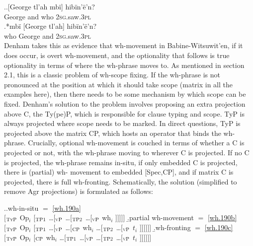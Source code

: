 \documentclass{glossa}
\begin{document}
\ex.\label{wh.230}\ag.{}[George tl'ah mb\"i] hib\"in'\"e'n?\\
   George and who \textsc{2sg}.saw.\textsc{3pl}\\
   \bg.*mb\"i [George tl'ah] hib\"in'\"e'n?\\
   who George and \textsc{2sg}.saw.\textsc{3pl}\\

Denham takes this as evidence that wh-movement in Babine-Witsuwit'en, if it does occur, is overt wh-movement, and the optionality that follows is true optionality in terms of where the wh-phrase moves to. As mentioned in section 2.1, this is a classic problem of wh-scope fixing. If the wh-phrase is not pronounced at the position at which it should take scope (matrix in all the examples here), then there needs to be some mechanism by which scope can be fixed. Denham's solution to the problem involves proposing an extra projection above C, the Ty(pe)P, which is responsible for clause typing and scope. TyP is always projected where scope needs to be marked. In direct questions, TyP is projected above the matrix CP, which hosts an operator that binds the wh-phrase. Crucially, optional wh-movement is couched in terms of whether a C is projected or not, with the wh-phrase moving to wherever C is projected. If no C is projected, the wh-phrase remains in-situ, if only embedded C is projected, there is (partial) wh- movement to embedded [Spec,CP], and if matrix C is projected, there is full wh-fronting. Schematically, the solution (simplified to remove Agr projections) is formulated as follows:

\ex.\a.\label{wh.240a}wh-in-situ $=$ \ref{wh.190a}\\{}[$_{\textsc{TyP}}$ Op$_i$ [$_{\textsc{TP1}}$ \dots [$_{\textsc{vP}}$ \dots [$_{\textsc{TP2}}$ \dots [$_{\textsc{vP}}$ wh$_i$ ]]]]]\hspace{\fill}
   \b.\label{wh.240b}partial wh-movement $=$ \ref{wh.190b}\\{}[$_{\textsc{TyP}}$ Op$_i$ [$_{\textsc{TP1}}$ \dots [$_{\textsc{vP}}$ \dots [$_{\textsc{CP}}$ wh$_i$ \dots [$_{\textsc{TP2}}$ \dots [$_{\textsc{vP}}$ $t_i$ ]]]]]]\hspace{\fill}
   \b.\label{wh.240c}wh-fronting $=$ \ref{wh.190c}\\{}[$_{\textsc{TyP}}$ Op$_i$ [$_{\textsc{CP}}$ wh$_i$ \dots [$_{\textsc{TP1}}$ \dots [$_{\textsc{vP}}$ \dots [$_{\textsc{TP2}}$ \dots [$_{\textsc{vP}}$ $t_i$ ]]]]]]\hspace{\fill}\hspace{\fill}
\end{document}

